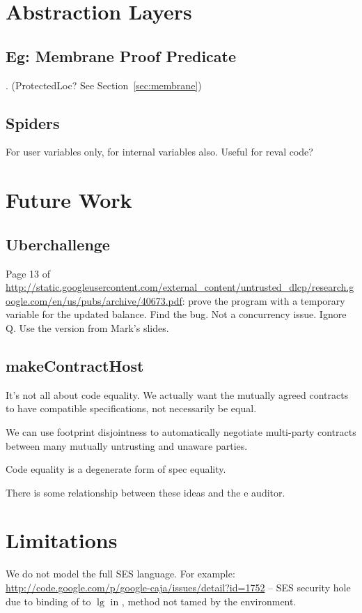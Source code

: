 \documentclass[a4paper]{article}
\begin{document}

\section{Abstraction Layers}

\subsection{Eg: Membrane Proof Predicate}
. (ProtectedLoc? See Section~\ref{sec:membrane})
\subsection{Spiders}

For user variables only, for internal variables also. Useful for reval code?

\section{Future Work}
\subsection{Uberchallenge}
Page 13 of
  \url{http://static.googleusercontent.com/external_content/untrusted_dlcp/research.google.com/en/us/pubs/archive/40673.pdf}:
  prove the program with a temporary variable for the updated balance. Find the
  bug.  Not a concurrency issue. Ignore Q. Use the version from Mark's slides.

\subsection{makeContractHost}
      It's not all about code equality. We actually want the mutually
      agreed contracts to have compatible specifications, not
      necessarily be equal.

      We can use footprint disjointness to automatically negotiate
      multi-party contracts between many mutually untrusting and
      unaware parties.

      Code equality is a degenerate form of spec equality.

      There is some relationship between these ideas and the e
      auditor.

\section{Limitations}
We do not model the full SES language. For example:
\url{http://code.google.com/p/google-caja/issues/detail?id=1752} -- SES security
hole due to binding of  to $\lg$ in , method not tamed by
the environment.



\end{document}
